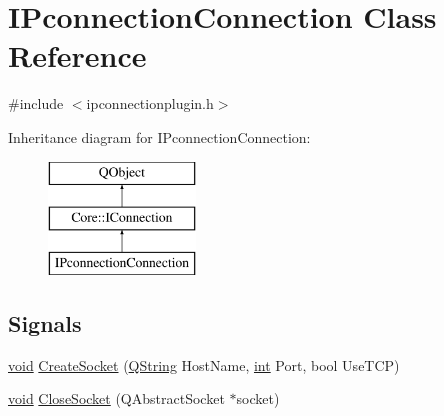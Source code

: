 \hypertarget{class_i_pconnection_connection}{\section{I\-Pconnection\-Connection Class Reference}
\label{class_i_pconnection_connection}
}


{\ttfamily \#include $<$ipconnectionplugin.\-h$>$}

Inheritance diagram for I\-Pconnection\-Connection\-:\begin{figure}[H]
\begin{center}
\leavevmode
\includegraphics[height=3.000000cm]{class_i_pconnection_connection}
\end{center}
\end{figure}
\subsection*{Signals}
\begin{DoxyCompactItemize}
\item 
\hyperlink{group___u_a_v_objects_plugin_ga444cf2ff3f0ecbe028adce838d373f5c}{void} \hyperlink{group___i_p_conn_plugin_gae512a545bf7714b3a085d0a9ffec49e5}{Create\-Socket} (\hyperlink{group___u_a_v_objects_plugin_gab9d252f49c333c94a72f97ce3105a32d}{Q\-String} Host\-Name, \hyperlink{ioapi_8h_a787fa3cf048117ba7123753c1e74fcd6}{int} Port, bool Use\-T\-C\-P)
\item 
\hyperlink{group___u_a_v_objects_plugin_ga444cf2ff3f0ecbe028adce838d373f5c}{void} \hyperlink{group___i_p_conn_plugin_ga382e928a679913b5d226abbd10a08167}{Close\-Socket} (Q\-Abstract\-Socket $\ast$socket)
\end{DoxyCompactItemize}
